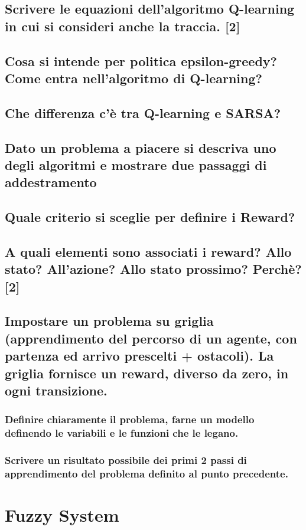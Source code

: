 \documentclass[\main/main.tex]{subfiles}
\begin{document}
\subsection{Scrivere le equazioni dell'algoritmo Q-learning in cui si consideri anche la traccia. [2]}
\subsection{Cosa si intende per politica epsilon-greedy? Come entra nell’algoritmo di Q-learning? }
\subsection{Che differenza c'è tra Q-learning e SARSA?}
\subsection{Dato un problema a piacere si descriva uno degli algoritmi e mostrare due passaggi di addestramento}
\subsection{Quale criterio si sceglie per definire i Reward?}
\subsection{A quali elementi sono associati i reward? Allo stato? All'azione? Allo stato prossimo? Perchè? [2]}
\subsection{Impostare un problema su griglia (apprendimento del percorso di un agente, con partenza ed arrivo prescelti + ostacoli). La griglia fornisce un reward, diverso da zero, in ogni transizione.}
\subsubsection{Definire chiaramente il problema, farne un modello definendo le variabili e le funzioni che le legano.}
\subsubsection{Scrivere un risultato possibile dei primi 2 passi di apprendimento del problema definito al punto precedente.} 

\clearpage
\section{Fuzzy System}
\end{document}
